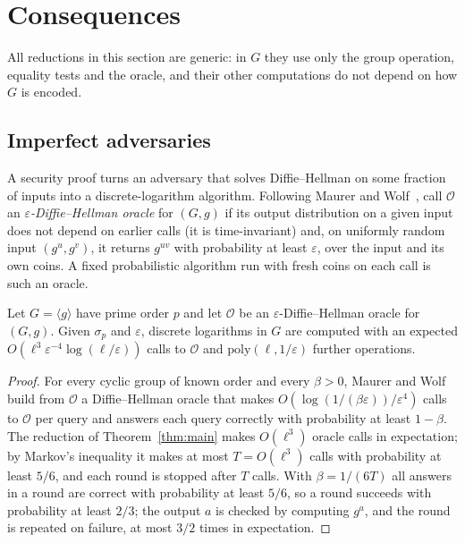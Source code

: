 \section{Consequences}\label{sec:consequences}

All reductions in this section are generic: in $G$ they use only the group operation, equality tests and the
oracle, and their other computations do not depend on how $G$ is encoded.

\subsection{Imperfect adversaries}
A security proof turns an adversary that solves Diffie--Hellman on some fraction of inputs into a
discrete-logarithm algorithm. Following Maurer and Wolf~\cite{MW96}, call $\mathcal O$ an
\emph{$\varepsilon$-Diffie--Hellman oracle} for $(G,g)$ if its output distribution on a given input does not
depend on earlier calls (it is time-invariant) and, on uniformly random input $(g^u,g^v)$, it returns $g^{uv}$
with probability at least $\varepsilon$, over the input and its own coins. A fixed
probabilistic algorithm run with fresh coins on each call is such an oracle.

\begin{corollary}\label{cor:imperfect}
Let $G=\langle g\rangle$ have prime order $p$ and let $\mathcal O$ be an $\varepsilon$-Diffie--Hellman oracle
for $(G,g)$. Given $\sigma_p$ and $\varepsilon$, discrete logarithms in $G$ are computed with an expected
$O(\ell^3\varepsilon^{-4}\log(\ell/\varepsilon))$ calls to $\mathcal O$ and $\mathrm{poly}(\ell,1/\varepsilon)$
further operations.
\end{corollary}

\begin{proof}
For every cyclic group of known order and every $\beta>0$, Maurer and Wolf~\cite[Thm.~1]{MW96} build from
$\mathcal O$ a Diffie--Hellman oracle that makes $O(\log(1/(\beta\varepsilon))/\varepsilon^4)$ calls to
$\mathcal O$ per query and answers each query correctly with probability at least $1-\beta$. The reduction of
Theorem~\ref{thm:main} makes $O(\ell^3)$ oracle calls in expectation; by Markov's inequality it makes at most
$T=O(\ell^3)$ calls with probability at least $5/6$, and each round is stopped after $T$ calls. With
$\beta=1/(6T)$ all answers in a round are correct with probability at least $5/6$, so a round succeeds with
probability at least $2/3$; the output $a$ is checked by computing $g^a$, and the round is repeated on
failure, at most $3/2$ times in expectation.
\end{proof}

